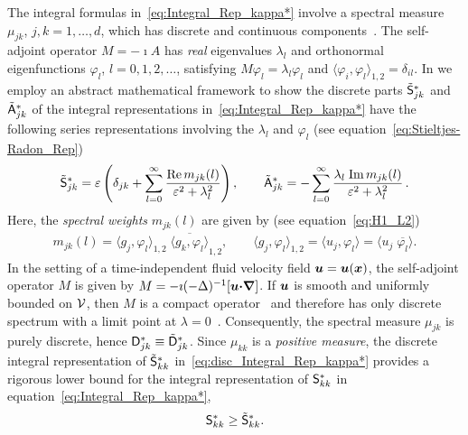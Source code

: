 \documentclass[amsa]{ipart}
\begin{document}
The integral formulas in~\eqref{eq:Integral_Rep_kappa*} involve
a spectral measure $\mu_{jk}$, $j,k=1,\ldots,d$, which has discrete and
continuous components~\cite{Reed-1980,Stone:64}. The self-adjoint
operator $M=-\imath A$ has \emph{real} eigenvalues $\lambda_l$ and orthonormal
eigenfunctions $\varphi_l$, $l=0,1,2,\ldots$, satisfying $M\varphi_l=\lambda_l\varphi_l$ and
$\langle\varphi_i,\varphi_l\rangle_{1,2}=\delta_{il}$. In  we employ an 
abstract mathematical framework to show the discrete parts
$\tilde{\mathsf{S}}^*_{jk}$ and $\tilde{\mathsf{A}}^*_{jk}$ of the integral representations
in~\eqref{eq:Integral_Rep_kappa*} have the following series
representations involving the $\lambda_l$ and $\varphi_l$ (see
equation~\eqref{eq:Stieltjes-Radon_Rep})
%
\begin{align}\label{eq:disc_Integral_Rep_kappa*}
  \tilde{\Sm}^*_{jk}=\varepsilon\left(\delta_{jk}+
    \sum_{l=0}^\infty\frac{\Real m_{jk}(l)}{\varepsilon^2+\lambda_l^2}
  \right),
  \qquad
  \tilde{\Am}^*_{jk}
  =-\sum_{l=0}^\infty\frac{\lambda_l\;\Imag m_{jk}(l)}{\varepsilon^2+\lambda_l^2}\,.
\end{align}
%
Here, the \emph{spectral weights} $m_{jk}(l)$ are given by (see
equation~\eqref{eq:H1_L2}) 
%
\begin{align}\label{eq:Spec_Weights}
  m_{jk}(l)=\langle g_j,\varphi_l\rangle_{1,2}\;\overline{\langle g_k,\varphi_l\rangle}_{1,2},
  \qquad
  \langle g_j,\varphi_l\rangle_{1,2}=\langle u_j,\varphi_l\rangle=\langle u_j\;\overline{\varphi_l}\rangle.
\end{align}
%
In the setting of a time-independent fluid velocity field
$\boldsymbol{u}=\boldsymbol{u}(\boldsymbol{x})$, the self-adjoint operator $M$ is given by
$M=-\imath(-\Delta)^{-1}[\boldsymbol{u}\mbox{\boldmath${\cdot}$}\mbox{\boldmath${\nabla}$}]$. If $\boldsymbol{u}$ is smooth and
uniformly bounded on $\mathcal{V}$, then $M$ is a compact
operator~\cite{Bhattacharya:AAP:1999:951} and therefore has only
discrete spectrum with a limit point at
$\lambda=0$~\cite{Stakgold:BVP:2000,Reed-1980}. Consequently, the spectral
measure $\mu_{jk}$ is purely discrete, hence
$\mathsf{D}^*_{jk}\equiv\tilde{\mathsf{D}}^*_{jk}$.
Since 
$\mu_{kk}$ is a \emph{positive measure}, the discrete integral
representation of $\tilde{\mathsf{S}}^*_{kk}$
in~\eqref{eq:disc_Integral_Rep_kappa*} provides a rigorous lower bound
for the integral representation of $\mathsf{S}^*_{kk}$ in
equation~\eqref{eq:Integral_Rep_kappa*}, 
%
\begin{align}\label{eq:LB:Skk}
  \Sm^*_{kk}\geq\tilde{\Sm}^*_{kk}.  
\end{align}
%
\end{document}
